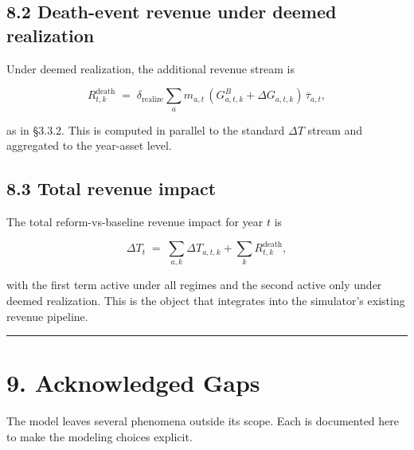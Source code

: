 \documentclass[11pt]{article}
\begin{document}
\subsection*{8.2 Death-event revenue under deemed realization}

Under deemed realization, the additional revenue stream is

\[
R^{\text{death}}_{t, k}
\;=\;
\delta_{\text{realize}}
\sum_a m_{a,t}\,(G^B_{a,t,k} + \Delta G_{a,t,k})\,\overline{\tau}_{a,t},
\]

as in §3.3.2. This is computed in parallel to the standard $\Delta T$ stream and aggregated to the year-asset level.

\subsection*{8.3 Total revenue impact}

The total reform-vs-baseline revenue impact for year $t$ is

\[
\Delta T_t
\;=\;
\sum_{a, k} \Delta T_{a, t, k} + \sum_k R^{\text{death}}_{t, k},
\]

with the first term active under all regimes and the second active only under deemed realization. This is the object that integrates into the simulator's existing revenue pipeline.

\par\medskip\hrule\medskip

\section*{9. Acknowledged Gaps}

The model leaves several phenomena outside its scope. Each is documented here to make the modeling choices explicit.
\end{document}
